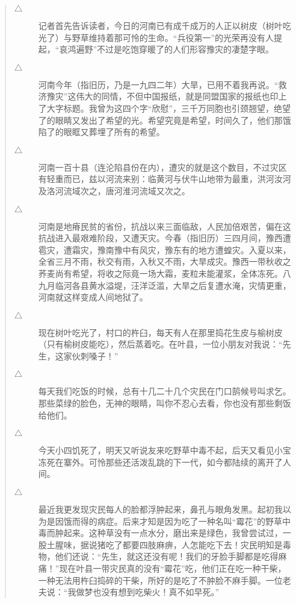 \begin{quote}
	\begin{description}
		\item [$\bigtriangleup$] 记者首先告诉读者，今日的河南已有成千成万的人正以树皮（树叶吃光了）与野草维持着那可怜的生命。“兵役第一”的光荣再没有人提起，“哀鸿遍野”不过是吃饱穿暖了的人们形容豫灾的凄楚字眼。\\
		
		\item [$\bigtriangleup$] 河南今年（指旧历，乃是一九四二年）大旱，已用不着我再说。“救济豫灾”这伟大的同情，不但中国报纸，就是同盟国家的报纸也印上了大字标题。我曾为这四个字“欣慰”，三千万同胞也引颈翘望，绝望了的眼睛又发出了希望的光。希望究竟是希望，时间久了，他们那饿陷了的眼眶又葬埋了所有的希望。\\
		
		\item [$\bigtriangleup$] 河南一百十县（连沦陷县份在内），遭灾的就是这个数目，不过灾区有轻重而已，兹以河流来别：临黄河与伏牛山地带为最重，洪河汝河及洛河流域次之，唐河淮河流域又次之。\\
		
		\item [$\bigtriangleup$] 河南是地瘠民贫的省份，抗战以来三面临敌，人民加倍艰苦，偏在这抗战进入最艰难阶段，又遭天灾。今春（指旧历）三四月间，豫西遭雹灾，遭霜灾，豫南豫中有风灾，豫东有的地方遭蝗灾。入夏以来，全省三月不雨，秋交有雨，入秋又不雨，大旱成灾。豫西一带秋收之荞麦尚有希望，将收之际竟一场大霜，麦粒未能灌浆，全体冻死。八九月临河各县黄水溢堤，汪洋泛滥，大旱之后复遭水淹，灾情更重，河南就这样变成人间地狱了。\\
		
		\item [$\bigtriangleup$] 现在树叶吃光了，村口的杵臼，每天有人在那里捣花生皮与榆树皮（只有榆树皮能吃），然后蒸着吃。在叶县，一位小朋友对我说：“先生，这家伙刺嗓子！”\\
		
		\item [$\bigtriangleup$] 每天我们吃饭的时候，总有十几二十几个灾民在门口鹄候号叫求乞。那些菜绿的脸色，无神的眼睛，叫你不忍心去看，你也没有那些剩饭给他们。\\
		
		\item [$\bigtriangleup$] 今天小四饥死了，明天又听说友来吃野草中毒不起，后天又看见小宝冻死在寨外。可怜那些还活泼乱跳的下一代，如今都陆续的离开了人间。\\
		
		\item [$\bigtriangleup$] 最近我更发现灾民每人的脸都浮肿起来，鼻孔与眼角发黑。起初我以为是因饿而得的病症。后来才知是因为吃了一种名叫“霉花”的野草中毒而肿起来。这种草没有一点水分，磨出来是绿色，我曾尝试过，一股土腥味，据说猪吃了都要四肢麻痹，人怎能吃下去！灾民明知是毒物，他们还说：“先生，就这还没有呢！我们的牙脸手脚都是吃得麻痛！”现在叶县一带灾民真的没有“霉花”吃，他们正在吃一种干柴，一种无法用杵臼捣碎的干柴，所好的是吃了不肿脸不麻手脚。一位老夫说：“我做梦也没有想到吃柴火！真不如早死。”\\
		

\end{description}
\end{quote}
